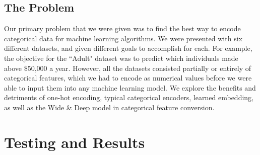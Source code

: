 \documentclass[12pt,letterpaper]{article}
\theoremstyle{plain}
\theoremstyle{definition}
\begin{document}
\subsection{The Problem}

\hspace{\parindent}Our primary problem that we were given was to find the best way to encode categorical data for machine learning algorithms. We were presented with six different datasets, and given different goals to accomplish for each. For example, the objective for the ``Adult" dataset was to predict which individuals made above \$50,000 a year. However, all the datasets consisted partially or entirely of categorical features, which we had to encode as numerical values before we were able to input them into any machine learning model. We explore the benefits and detriments of one-hot encoding, typical categorical encoders, learned embedding, as well as the Wide \& Deep model in categorical feature conversion. 

\section{Testing and Results}
\end{document}
